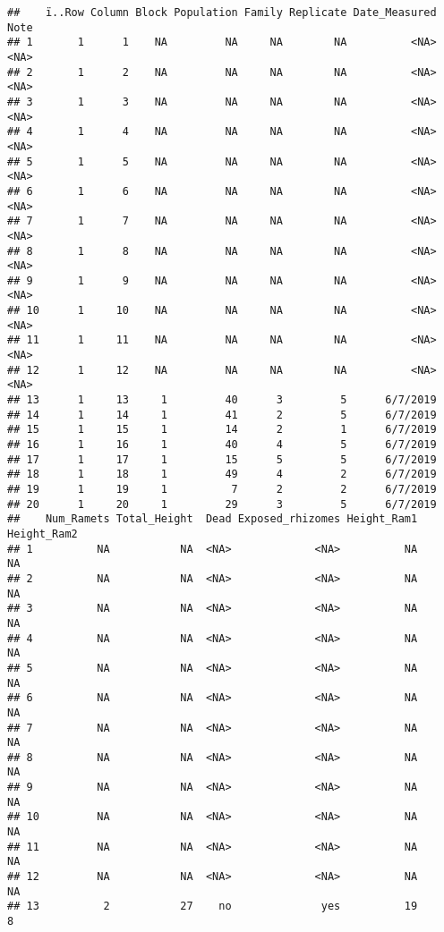 \documentclass[]{article}
\begin{document}
\begin{verbatim}
##    ï..Row Column Block Population Family Replicate Date_Measured Note
## 1       1      1    NA         NA     NA        NA          <NA> <NA>
## 2       1      2    NA         NA     NA        NA          <NA> <NA>
## 3       1      3    NA         NA     NA        NA          <NA> <NA>
## 4       1      4    NA         NA     NA        NA          <NA> <NA>
## 5       1      5    NA         NA     NA        NA          <NA> <NA>
## 6       1      6    NA         NA     NA        NA          <NA> <NA>
## 7       1      7    NA         NA     NA        NA          <NA> <NA>
## 8       1      8    NA         NA     NA        NA          <NA> <NA>
## 9       1      9    NA         NA     NA        NA          <NA> <NA>
## 10      1     10    NA         NA     NA        NA          <NA> <NA>
## 11      1     11    NA         NA     NA        NA          <NA> <NA>
## 12      1     12    NA         NA     NA        NA          <NA> <NA>
## 13      1     13     1         40      3         5      6/7/2019     
## 14      1     14     1         41      2         5      6/7/2019     
## 15      1     15     1         14      2         1      6/7/2019     
## 16      1     16     1         40      4         5      6/7/2019     
## 17      1     17     1         15      5         5      6/7/2019     
## 18      1     18     1         49      4         2      6/7/2019     
## 19      1     19     1          7      2         2      6/7/2019     
## 20      1     20     1         29      3         5      6/7/2019     
##    Num_Ramets Total_Height  Dead Exposed_rhizomes Height_Ram1 Height_Ram2
## 1          NA           NA  <NA>             <NA>          NA          NA
## 2          NA           NA  <NA>             <NA>          NA          NA
## 3          NA           NA  <NA>             <NA>          NA          NA
## 4          NA           NA  <NA>             <NA>          NA          NA
## 5          NA           NA  <NA>             <NA>          NA          NA
## 6          NA           NA  <NA>             <NA>          NA          NA
## 7          NA           NA  <NA>             <NA>          NA          NA
## 8          NA           NA  <NA>             <NA>          NA          NA
## 9          NA           NA  <NA>             <NA>          NA          NA
## 10         NA           NA  <NA>             <NA>          NA          NA
## 11         NA           NA  <NA>             <NA>          NA          NA
## 12         NA           NA  <NA>             <NA>          NA          NA
## 13          2           27    no              yes          19           8

\end{verbatim}
\end{document}
